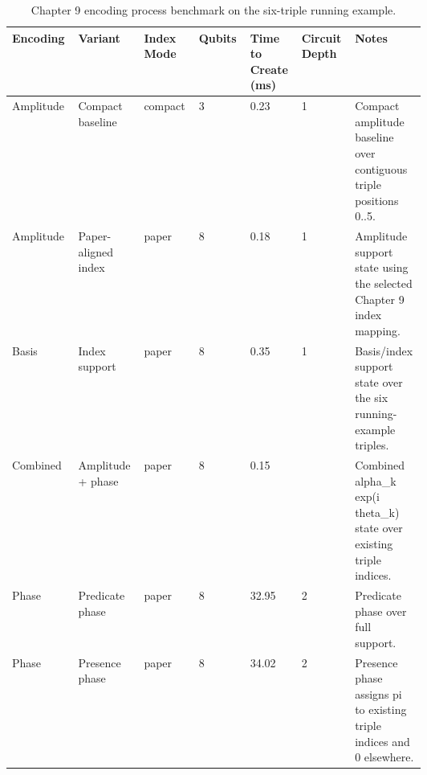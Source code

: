 \begin{table}[t]
\centering
\scriptsize
\setlength{\tabcolsep}{2pt}
\renewcommand{\arraystretch}{1.08}
\caption{Chapter 9 encoding process benchmark on the six-triple running example.}
\label{tab:chapter9-encoding-process}
\begin{tabular}{@{}p{0.085\linewidth}p{0.085\linewidth}p{0.085\linewidth}p{0.085\linewidth}p{0.085\linewidth}p{0.085\linewidth}p{0.085\linewidth}@{}}
\hline
Encoding & Variant & Index Mode & Qubits & Time to Create (ms) & Circuit Depth & Notes \\
\hline
Amplitude & Compact baseline & compact & 3 & 0.23 & 1 & Compact amplitude baseline over contiguous triple positions 0..5. \\
Amplitude & Paper-aligned index & paper & 8 & 0.18 & 1 & Amplitude support state using the selected Chapter 9 index mapping. \\
Basis & Index support & paper & 8 & 0.35 & 1 & Basis/index support state over the six running-example triples. \\
Combined & Amplitude + phase & paper & 8 & 0.15 &  & Combined alpha\_k exp(i theta\_k) state over existing triple indices. \\
Phase & Predicate phase & paper & 8 & 32.95 & 2 & Predicate phase over full support. \\
Phase & Presence phase & paper & 8 & 34.02 & 2 & Presence phase assigns pi to existing triple indices and 0 elsewhere. \\
\hline
\end{tabular}
\end{table}
